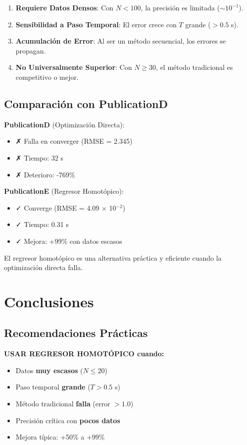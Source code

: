 \documentclass[11pt,a4paper]{article}
\begin{document}
\begin{enumerate}
\item \textbf{Requiere Datos Densos}: Con $N < 100$, la precisión es limitada ($\sim 10^{-1}$).
\item \textbf{Sensibilidad a Paso Temporal}: El error crece con $T$ grande ($> 0.5$ s).
\item \textbf{Acumulación de Error}: Al ser un método secuencial, los errores se propagan.
\item \textbf{No Universalmente Superior}: Con $N \geq 30$, el método tradicional es competitivo o mejor.
\end{enumerate}

\subsection{Comparación con PublicationD}

\textbf{PublicationD} (Optimización Directa):
\begin{itemize}
\item \textcolor{red!70!black}{✗ Falla en converger (RMSE = 2.345)}
\item \textcolor{red!70!black}{✗ Tiempo: 32 s}
\item \textcolor{red!70!black}{✗ Deterioro: -769\%}
\end{itemize}

\textbf{PublicationE} (Regresor Homotópico):
\begin{itemize}
\item \textcolor{green!70!black}{✓ Converge (RMSE = 4.09 $\times$ 10$^{-2}$)}
\item \textcolor{green!70!black}{✓ Tiempo: 0.31 s}
\item \textcolor{green!70!black}{✓ Mejora: +99\% con datos escasos}
\end{itemize}

El regresor homotópico es una alternativa práctica y eficiente cuando la optimización directa falla.

\section{Conclusiones}

\subsection{Recomendaciones Prácticas}

\textbf{USAR REGRESOR HOMOTÓPICO cuando:}
\begin{itemize}
\item Datos \textbf{muy escasos} ($N \leq 20$)
\item Paso temporal \textbf{grande} ($T > 0.5$ s)
\item Método tradicional \textbf{falla} (error $> 1.0$)
\item Precisión crítica con \textbf{pocos datos}
\item Mejora típica: +50\% a +99\%
\end{itemize}
\end{document}
